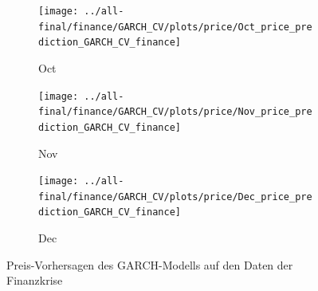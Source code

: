 \documentclass[ngerman]{ttlab-qualify}
\begin{document}
\begin{figure}[H]
\begin{subfigure}{.3\linewidth}
  \texttt{[image: ../all-final/finance/GARCH\_CV/plots/price/Oct\_price\_prediction\_GARCH\_CV\_finance]}\hfill
  \caption{Oct}
  \end{subfigure}
  \begin{subfigure}{.3\linewidth}
  \texttt{[image: ../all-final/finance/GARCH\_CV/plots/price/Nov\_price\_prediction\_GARCH\_CV\_finance]}\hfill
  \caption{Nov}
  \end{subfigure}
  \begin{subfigure}{.3\linewidth}
  \texttt{[image: ../all-final/finance/GARCH\_CV/plots/price/Dec\_price\_prediction\_GARCH\_CV\_finance]}\hfill
  \caption{Dec}
  \end{subfigure}
  \caption{Preis-Vorhersagen des GARCH-Modells auf den Daten der Finanzkrise}
\end{figure}
\end{document}
